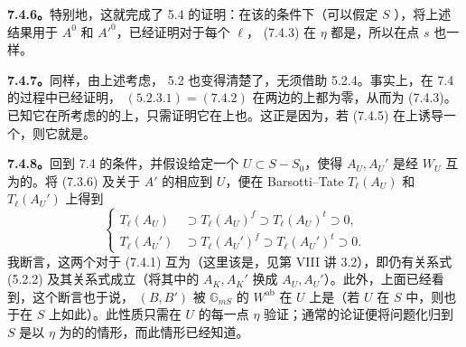 \textbf{7.4.6。}特别地，这就完成了 5.4 的证明：在该的条件下（可以假定 $S$ ），将上述结果用于 $A^0$ 和 $A'^0$，已经证明对于每个 $\ell$， (7.4.3) 在 $\eta$ 都是，所以在点 $s$ 也一样。

\textbf{7.4.7。}同样，由上述考虑， 5.2 也变得清楚了，无须借助 5.2.4。事实上，在 7.4 的过程中已经证明， $(5.2.3.1)=(7.4.2)$ 在两边的上都为零，从而为 (7.4.3)。已知它在所考虑的的上，只需证明它在上也。这正是因为，若 (7.4.5) 在上诱导一个，则它就是。

\textbf{7.4.8。}回到 7.4 的条件，并假设给定一个 $U\subset S-S_0$，使得 $A_U,A_U'$ 是经 $W_U$ 互为的。将 (7.3.6) 及关于 $A'$ 的相应到 $U$，便在 Barsotti--Tate  $T_\ell(A_U)$ 和 $T_\ell(A_U')$ 上得到
\begin{equation}\tag{7.4.9}
 \left\{\begin{aligned}
 T_\ell(A_U)&\supset T_\ell(A_U)^f\supset T_\ell(A_U)^t\supset0,\\
 T_\ell(A_U')&\supset T_\ell(A_U')^f\supset T_\ell(A_U')^t\supset0.
 \end{aligned}\right.
\end{equation}
我断言，这两个对于 (7.4.1) 互为（这里该是，见第 VIII 讲 3.2），即仍有关系式 (5.2.2) 及其关系式成立（将其中的 $A_K,A_K'$ 换成 $A_U,A_U'$）。此外，上面已经看到，这个断言也于说，
$(B,B')$ 被 $\mathbb G_{mS}$ 的 $W^{\mathrm{ab}}$ 在 $U$ 上是（若 $U$ 在 $S$ 中，则也于在 $S$ 上如此）。此性质只需在 $U$ 的每一点 $\eta$ 验证；通常的论证便将问题化归到 $S$ 是以 $\eta$ 为的的情形，而此情形已经知道。

